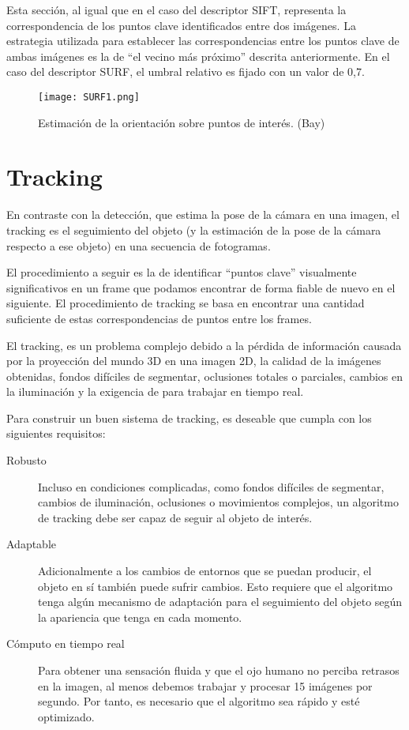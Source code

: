 Esta sección, al igual que en el caso del descriptor SIFT, representa la correspondencia de los puntos clave identificados entre dos imágenes. La estrategia utilizada para establecer las correspondencias entre los puntos clave de ambas imágenes es la de ``el vecino más próximo'' descrita anteriormente. En el caso del descriptor SURF, el umbral relativo es fijado con un valor de 0,7.

\begin{figure}
  \centering        
  \texttt{[image: SURF1.png]}
  \caption{Estimación de la orientación sobre puntos de interés. (Bay)}
  \label{fig:SURF1}
\end{figure}

\section{Tracking}
En contraste con la detección, que estima la pose de la cámara en una imagen, el tracking es el seguimiento del objeto (y la estimación de la pose de la cámara respecto a ese objeto) en una secuencia de fotogramas.

El procedimiento a seguir es la de identificar ``puntos clave'' visualmente significativos en un frame que podamos encontrar de forma fiable de nuevo en el siguiente. El procedimiento de tracking se basa en encontrar una cantidad suficiente de estas correspondencias de puntos entre los frames.

El tracking, es un problema complejo debido a la pérdida de información causada por la proyección del mundo 3D en una imagen 2D, la calidad de la imágenes obtenidas, fondos difíciles de segmentar, oclusiones totales o parciales, cambios en la iluminación y la exigencia de para trabajar en tiempo real. 

Para construir un buen sistema de tracking, es deseable que cumpla con los siguientes requisitos:

\begin{description}
\item [Robusto] Incluso en condiciones complicadas, como fondos difíciles de segmentar, cambios de iluminación, oclusiones o movimientos complejos, un algoritmo de tracking debe ser capaz de seguir al objeto de interés.

\item [Adaptable] Adicionalmente a los cambios de entornos que se puedan producir, el objeto en sí también puede sufrir cambios. Esto requiere que el algoritmo tenga algún mecanismo de adaptación para el seguimiento del objeto según la apariencia que tenga en cada momento.

\item [Cómputo en tiempo real] Para obtener una sensación fluida y que el ojo humano no perciba retrasos en la imagen, al menos debemos trabajar y procesar 15 imágenes por segundo. Por tanto, es necesario que el algoritmo sea rápido y esté optimizado.

\end{description}

